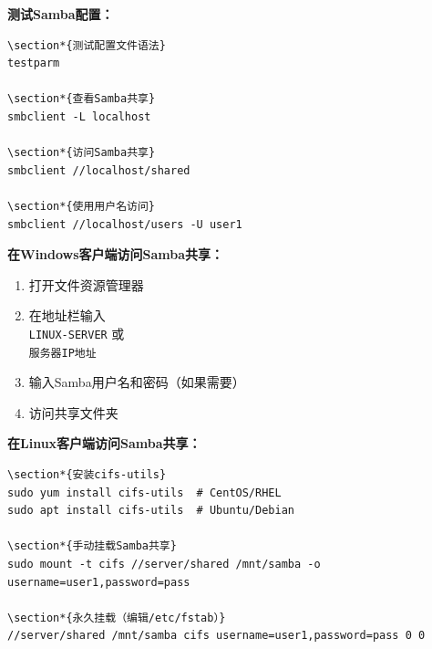 \documentclass[12pt,UTF8]{ctexbook}
\begin{document}
\textbf{测试Samba配置：}
\begin{verbatim}
\section*{测试配置文件语法}
testparm

\section*{查看Samba共享}
smbclient -L localhost

\section*{访问Samba共享}
smbclient //localhost/shared

\section*{使用用户名访问}
smbclient //localhost/users -U user1
\end{verbatim}

\textbf{在Windows客户端访问Samba共享：}
\begin{enumerate}
    \item 打开文件资源管理器
    \item 在地址栏输入 \texttt{\\LINUX-SERVER} 或 \texttt{\\服务器IP地址}
    \item 输入Samba用户名和密码（如果需要）
    \item 访问共享文件夹
\end{enumerate}

\textbf{在Linux客户端访问Samba共享：}
\begin{verbatim}
\section*{安装cifs-utils}
sudo yum install cifs-utils  # CentOS/RHEL
sudo apt install cifs-utils  # Ubuntu/Debian

\section*{手动挂载Samba共享}
sudo mount -t cifs //server/shared /mnt/samba -o username=user1,password=pass

\section*{永久挂载（编辑/etc/fstab）}
//server/shared /mnt/samba cifs username=user1,password=pass 0 0
\end{verbatim}
\end{document}
